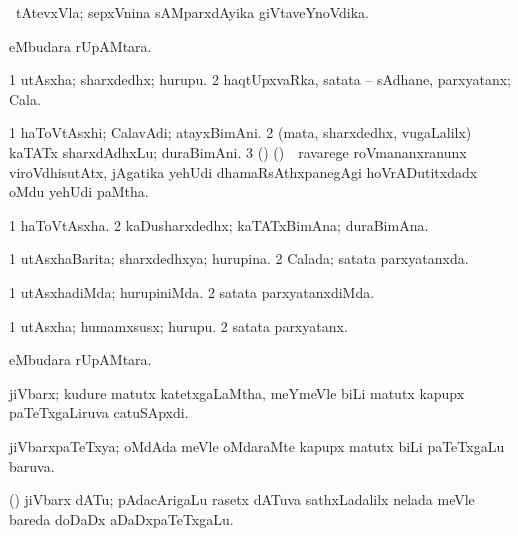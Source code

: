 \bentry
{} 
\gl{\nA} 
\bmng
\Sp\ tAtevxVla; sepxVnina sAMparxdAyika giVtaveYnoVdika.
\emng
\eentry

\bentry
{} 
\gl{\nA}
\bmng
{} eMbudara rUpAMtara.
\emng
\eentry

\bentry
{} 
\gl{\nA}
\bmng
\bnum
\num{1} utAsxha; sharxdedhx; hurupu. 
\num{2} haqtUpxvaRka, satata -- sAdhane, parxyatanx; Cala.
\enum
\emng
\eentry

\bentry
{} 
\gl{\nA} 
\bmng
\bnum
\num{1} haToVtAsxhi; CalavAdi; atayxBimAni.  
\num{2} (mata, sharxdedhx, \mo vugaLalilx) kaTATx sharxdAdhxLu; duraBimAni. 
\num{3} () (\ca) \kirxsha\ \,ravarege roVmananxranunx viroVdhisutAtx, jAgatika yehUdi dhamaRsAthxpanegAgi hoVrADutitxdadx oMdu yehUdi paMtha.
\enum
\emng
\eentry

\bentry
{} 
\gl{\nA} 
\bmng
\bnum
\num{1} haToVtAsxha. 
\num{2} kaDusharxdedhx; kaTATxBimAna; duraBimAna.
\enum
\emng
\eentry

\bentry
{} 
\gl{\gu} 
\bmng
\bnum
\num{1} utAsxhaBarita; sharxdedhxya; hurupina. 
\num{2} Calada; satata parxyatanxda.
\enum
\emng
\eentry

\bentry
{} 
\gl{\kirxvi} 
\bmng
\bnum
\num{1} utAsxhadiMda; hurupiniMda. 
\num{2} satata parxyatanxdiMda.
\enum
\emng
\eentry

\bentry
{} 
\gl{\nA} 
\bmng
\bnum
\num{1} utAsxha; humamxsusx; hurupu. 
\num{2} satata parxyatanx.
\enum
\emng
\eentry

\bentry
{} 
\gl{\nA} 
\bmng
{} eMbudara rUpAMtara.
\emng
\eentry

\bentry
{} 
\gl{\nA}
\bmng
jiVbarx; kudure matutx katetxgaLaMtha, meYmeVle biLi matutx kapupx  paTeTxgaLiruva catuSApxdi. \quad {}
\emng
\eentry

\bentry
{} 
\gl{\gu} 
\bmng
jiVbarxpaTeTxya; oMdAda meVle oMdaraMte kapupx matutx biLi paTeTxgaLu baruva.
\emng
\eentry

\bentry
{}  
\gl{\nA} 
\bmng
(\birx) jiVbarx dATu; pAdacArigaLu rasetx dATuva sathxLadalilx nelada  meVle bareda doDaDx aDaDxpaTeTxgaLu.
\emng
\eentry

